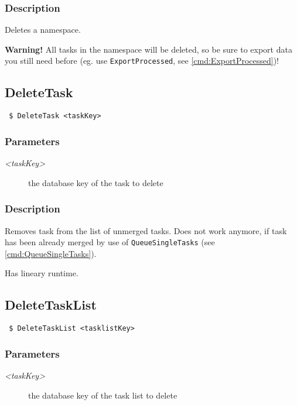 \documentclass[a4paper,11pt]{article}
\begin{document}
\subsubsection{Description}
Deletes a namespace.

\textbf{Warning!} All tasks in the namespace will be deleted, so be sure to export data you still need before (eg. use \texttt{ExportProcessed}, see \ref{cmd:ExportProcessed})!

\newpage


\subsection{DeleteTask\label{cmd:DeleteTask}}
\begin{verbatim}
 $ DeleteTask <taskKey>
\end{verbatim}

\subsubsection{Parameters}
\begin{description}
\item[\textit{<taskKey>}] the database key of the task to delete
\end{description}

\subsubsection{Description}
Removes task from the list of unmerged tasks. Does not work anymore, if task has been already merged by use of \texttt{QueueSingleTasks} (see \ref{cmd:QueueSingleTasks}).

Has lineary runtime.

\newpage


\subsection{DeleteTaskList\label{cmd:DeleteTaskList}}
\begin{verbatim}
 $ DeleteTaskList <tasklistKey>
\end{verbatim}

\subsubsection{Parameters}
\begin{description}
\item[\textit{<taskKey>}] the database key of the task list to delete
\end{description}
\end{document}
